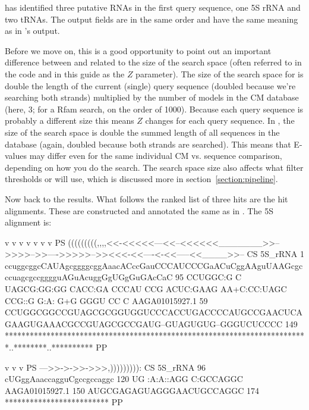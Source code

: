  has identified three putative RNAs in the first query
sequence, one 5S rRNA and two tRNAs. The output fields are in the
same order and have the same meaning as in 's output.

Before we move on, this is a good opportunity to point out an
important difference between  and  related
to the size of the search space (often referred to in the code and in
this guide as the $Z$ parameter).  The size of the search space for
 is double the length of the current (single) query
sequence (doubled because we're searching both strands) multiplied by
the number of models in the CM database (here, 3; for a Rfam search,
on the order of 1000). Because each query sequence is probably a
different size this means $Z$ changes for each query sequence. In
, the size of the search space is double the summed
length of all sequences in the database (again, doubled because both
strands are searched). This means that E-values may differ even for
the same individual CM vs. sequence comparison, depending on how you
do the search. The search space size also affects what filter
thresholds  or  will use, which is
discussed more in section~\ref{section:pipeline}.

Now back to the  results. What follows the ranked list of
three hits are the hit alignments. These are constructed and annotated
the same as in . The 5S alignment is:

\begin{widesreoutput}
                             v               v       v         v         v             v            v                PS
                     (((((((((,,,,<<-<<<<<---<<--<<<<<<_______>>-->>>>-->>---->>>>>-->><<<-<<----<-<<-----<<____>>-- CS
         5S_rRNA   1 ccuggcggcCAUAgcggggcggAaacACccGauCCCAUCCCGaACuCggAAguUAAGcgcccuagcgccgggguAGuAcuggGgUGgGuGAcCaC 95 
                     CCUGGC:G C UAGCG:GG:GG   CACC:GA CCCAU CCG ACUC:GAAG  AA+C:CC:UAGC CCG::G  G:A: G+G  GGGU  CC C
  AAGA01015927.1  59 CCUGGCGGCCGUAGCGCGGUGGUCCCACCUGACCCCAUGCCGAACUCAGAAGUGAAACGCCGUAGCGCCGAUG--GUAGUGUG--GGGUCUCCCC 149
                     *************************************************************************..********..********** PP

                        v         v v          PS
                     --->>->->>->>>,))))))))): CS
         5S_rRNA  96 cUGggAaaccagguCgccgccaggc 120
                      UG :A:A::AGG   C:GCCAGGC
  AAGA01015927.1 150 AUGCGAGAGUAGGGAACUGCCAGGC 174
                     ************************* PP
\end{widesreoutput}

